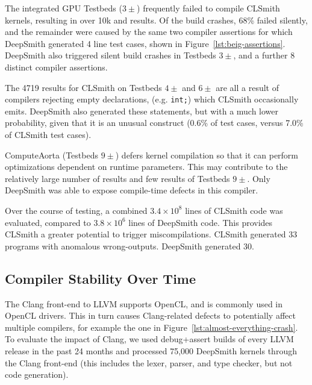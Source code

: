 The integrated GPU Testbeds ($3\pm$) frequently failed to compile CLSmith
kernels, resulting in over 10k \bc and \bto results. Of the build crashes, 68\%
failed silently, and the remainder were caused by the same two compiler
assertions for which DeepSmith generated 4 line test cases, shown in
Figure~\ref{lst:beig-assertions}. DeepSmith also triggered silent build crashes
in Testbeds $3\pm$, and a further 8 distinct compiler assertions.

The 4719 \abf results for CLSmith on Testbeds $4\pm$ and $6\pm$ are all a result
of compilers rejecting empty declarations, (e.g. \texttt{int;}) which CLSmith
occasionally emits. DeepSmith also generated these statements, but with a much
lower probability, given that it is an unusual construct (0.6\% of test cases,
versus 7.0\% of CLSmith test cases).

ComputeAorta (Testbeds $9\pm$) defers kernel compilation so that it can perform
optimizations dependent on runtime parameters. This may contribute to the
relatively large number of \arc results and few \bc results of Testbeds $9\pm$.
Only DeepSmith was able to expose compile-time defects in this compiler.

Over the course of testing, a combined $3.4 \times 10^8$ lines of CLSmith code
was evaluated, compared to $3.8 \times 10^6$ lines of DeepSmith code. This
provides CLSmith a greater potential to trigger miscompilations. CLSmith
generated 33 programs with anomalous wrong-outputs. DeepSmith generated 30.


\subsection{Compiler Stability Over Time}%
\label{subsec:clangs}

The Clang front-end to LLVM supports OpenCL, and is commonly used in OpenCL
drivers. This in turn causes Clang-related defects to potentially affect
multiple compilers, for example the one in 
Figure~\ref{lst:almost-everything-crash}. To evaluate the impact of Clang, we 
used debug+assert builds of every LLVM release in the past 24 months and 
processed 75,000 DeepSmith kernels through the Clang front-end (this includes 
the lexer, parser, and type checker, but not code generation).

